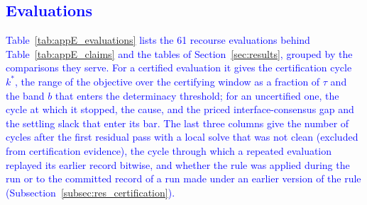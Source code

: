 \documentclass[preprint,12pt]{elsarticle}
\begin{document}
{\begin{longtable}{@{}r >{\raggedright\arraybackslash}p{} c r r r c r r c@{}}
\end{longtable}}

\subsection{\textcolor{blue}{Evaluations}}
\label{app:results_evaluations}

\textcolor{blue}{
    Table~\ref{tab:appE_evaluations} lists the 61 recourse evaluations behind Table~\ref{tab:appE_claims} and the tables of Section~\ref{sec:results}, grouped by the comparisons they serve. For a certified evaluation it gives the certification cycle $k^{*}$, the range of the objective over the certifying window as a fraction of $\tau$ and the band $b$ that enters the determinacy threshold; for an uncertified one, the cycle at which it stopped, the cause, and the priced interface-consensus gap and the settling slack that enter its bar. The last three columns give the number of cycles after the first residual pass with a local solve that was not clean (excluded from certification evidence), the cycle through which a repeated evaluation replayed its earlier record bitwise, and whether the rule was applied during the run or to the committed record of a run made under an earlier version of the rule (Subsection~\ref{subsec:res_certification}).
}
\end{document}
